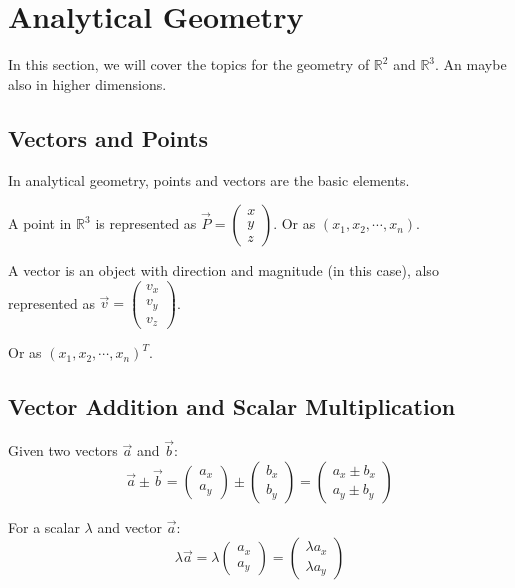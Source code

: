 \section{Analytical Geometry}

In this section, we will cover the topics for the geometry of \(\mathbb{R}^2\) and \(\mathbb{R}^3\).
An maybe also in higher dimensions.

\subsection{Vectors and Points}
In analytical geometry, points and vectors are the basic elements.

A point in \(\mathbb{R}^3\) is represented as \(\vec{P} = \begin{pmatrix} x \\ y \\ z \end{pmatrix}\).
Or as \((x_1, x_2, \cdots , x_n)\).

A vector is an object with direction and magnitude (in this case), also represented as \(\vec{v} = \begin{pmatrix} v_x \\ v_y \\ v_z \end{pmatrix}\).

Or as \((x_1, x_2, \cdots , x_n)^{T}\).

\subsection{Vector Addition and Scalar Multiplication}
Given two vectors \(\vec{a}\) and \(\vec{b}\):
\[
	\vec{a} \pm  \vec{b} = \begin{pmatrix} a_x \\ a_y \end{pmatrix} \pm \begin{pmatrix} b_x \\ b_y \end{pmatrix} = \begin{pmatrix} a_x \pm b_x \\ a_y \pm b_y \end{pmatrix}
\]

For a scalar \(\lambda\) and vector \(\vec{a}\):
\[
	\lambda \vec{a} = \lambda \begin{pmatrix} a_x \\ a_y \end{pmatrix} = \begin{pmatrix} \lambda a_x \\ \lambda a_y \end{pmatrix}
\]

